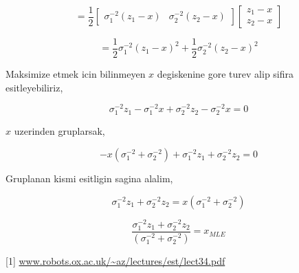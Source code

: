 \documentclass[12pt,fleqn]{article}\usepackage{../common}
\begin{document}
$$ = \frac{1}{2}  
\left[\begin{array}{cc}
\sigma_1^{-2}(z_1-x) & \sigma_2^{-2} (z_2-x)
\end{array}\right]
\left[\begin{array}{c}
z_1-x \\ z_2-x
\end{array}\right]
$$

$$ = 
\frac{1}{2}\sigma_1^{-2}(z_1-x)^2 + \frac{1}{2}\sigma_2^{-2} (z_2-x)^2
$$

Maksimize etmek icin bilinmeyen $x$ degiskenine gore turev alip sifira
esitleyebiliriz, 

$$ 
\sigma_1^{-2}z_1-\sigma_1^{-2}x + \sigma_2^{-2}z_2-\sigma_2^{-2}x = 0
$$

$x$ uzerinden gruplarsak,

$$ 
-x(\sigma_1^{-2}+\sigma_2^{-2}) + \sigma_1^{-2}z_1+ \sigma_2^{-2}z_2 = 0
$$

Gruplanan kismi esitligin sagina alalim,

$$ 
\sigma_1^{-2}z_1+ \sigma_2^{-2}z_2 = x(\sigma_1^{-2}+\sigma_2^{-2}) 
$$

$$ 
\frac{\sigma_1^{-2}z_1+ \sigma_2^{-2}z_2 }{(\sigma_1^{-2}+\sigma_2^{-2})}= x_{MLE}
$$

[1] \url{www.robots.ox.ac.uk/~az/lectures/est/lect34.pdf}
\end{document}
